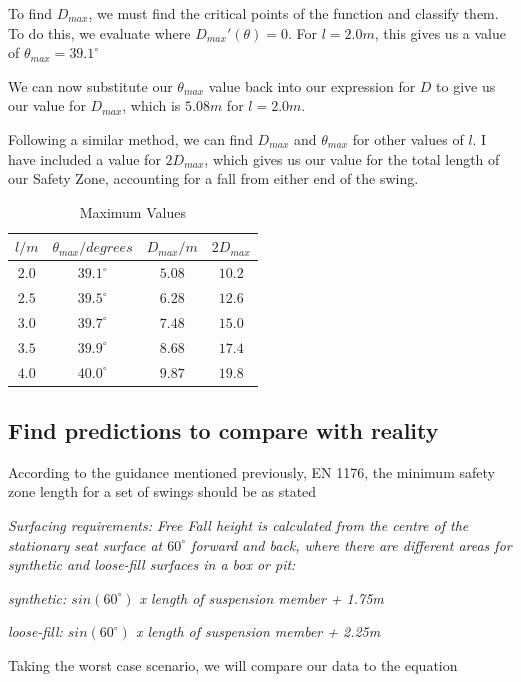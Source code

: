 \documentclass{article}
\begin{document}
To find $D_{max}$, we must find the critical points of the function and classify them. To do this, we evaluate where $D_{max}'(\theta) = 0$. For $l = 2.0m$, this gives us a value of $\theta_{max} = 39.1^\circ$

We can now substitute our $\theta_{max}$ value back into our expression for $D$ to give us our value for $D_{max}$, which is $5.08m$ for $l = 2.0m$.

Following a similar method, we can find $D_{max}$ and $\theta_{max}$ for other values of $l$. I have included a value for $2D_{max}$, which gives us our value for the total length of our Safety Zone, accounting for a fall from either end of the swing.


\begin{table}[H]
    \centering
    \begin{tabular}{|c|c|c|c|} \hline 
         $l/m$&  $\theta_{max}/degrees$&  $D_{max}/m$& $2D_{max}$\\ \hline
         $2.0$&  $39.1^\circ$&  $5.08$& $10.2$\\ \hline
         $2.5$&  $39.5^\circ$&  $6.28$& $12.6$\\ \hline
         $3.0$&  $39.7^\circ$&  $7.48$& $15.0$\\ \hline
         $3.5$&  $39.9^\circ$&  $8.68$& $17.4$\\ \hline
         $4.0$&  $40.0^\circ$&  $9.87$& $19.8$\\ \hline
    \end{tabular}
    \caption{Maximum Values}
    \label{tab:Max values}
\end{table}

\subsection*{Find predictions to compare with reality}
According to the guidance mentioned previously, EN 1176, the minimum safety zone length for a set of swings should be as stated 

\textit{\noindent Surfacing requirements: Free Fall height is calculated from the centre of the stationary seat surface at $60^\circ$ forward and back, where there are different areas for synthetic and loose-fill surfaces in a box or pit:}
\par
\textit{synthetic: $sin(60^\circ)$ x length of suspension member + 1.75m}
\par
\textit{loose-fill: $sin(60^\circ)$ x length of suspension member + 2.25m}

Taking the worst case scenario, we will compare our data to the equation
\end{document}

